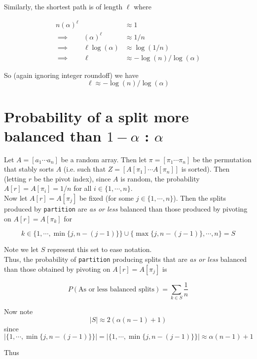 \documentclass[paper=a4, fontsize=11pt]{scrartcl} %
\numberwithin{equation}{section} %
\numberwithin{figure}{section} %
\numberwithin{table}{section} %
\begin{document}
Similarly, the shortest path is of length $\ell$ where

\begin{align*}
n (\alpha)^\ell & \approx 1\\
\implies \qquad{} (\alpha)^\ell & \approx 1/n \\
\implies \qquad{} \ell \log(\alpha) & \approx \log(1/n) \\
\implies \qquad{} \ell & \approx -\log(n)/\log(\alpha)
\end{align*}

So (again ignoring integer roundoff) we have
\[\ell \approx -\log(n)/\log(\alpha)\]

\section{Probability of a split more balanced than $1 - \alpha$ : $\alpha$}

Let $A = [a_1 \cdots a_n]$ be a random array. Then let $\pi = [\pi_1 \cdots \pi_n]$ be the permutation that stably sorts $A$ (i.e. such that $Z = [A[\pi_1] \cdots A[\pi_n]]$ is sorted). Then (letting $r$ be the pivot index), since $A$ is random, the probability $A[r] = A[\pi_i] = 1/n$ for all $i \in \{1, \cdots, n\}$.\\

Now let $A[r] = A[\pi_j]$ be fixed (for some $j \in \{1, \cdots, n\}$). Then the splits produced by \texttt{partition} are \emph{as or less} balanced than those produced by pivoting on $A[r] = A[\pi_k]$ for

\[k \in \{1, \cdots, \min\{j, n - (j - 1)\}\} \cup \{\max\{j, n - (j - 1)\}, \cdots, n\} = S\]
 
Note we let $S$ represent this set to ease notation. \\

Thus, the probability of \texttt{partition} producing splits that are \emph{as or less} balanced than those obtained by pivoting on $A[r] = A[\pi_j]$ is

\[P(\textrm{As or less balanced splits}) = \sum_{k \in S} \frac{1}{n}\]

Now note
\[|S| \approx 2 (\alpha (n-1) + 1)\]
since
\[|\{1, \cdots, \min\{j, n - (j - 1)\}\}| = |\{1, \cdots, \min\{j, n - (j - 1)\}\}| \approx \alpha (n-1) + 1\]

Thus
\end{document}
